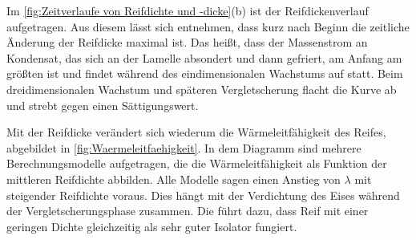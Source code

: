 Im \ref{fig:Zeitverlaufe von Reifdichte und -dicke}(b) ist der Reifdickenverlauf aufgetragen. Aus diesem lässt sich entnehmen, dass kurz nach Beginn die zeitliche Änderung der Reifdicke maximal ist. Das heißt, dass der Massenstrom an Kondensat, das sich an der Lamelle absondert und dann gefriert, am Anfang am größten ist und findet während des eindimensionalen Wachstums auf statt. Beim dreidimensionalen Wachstum und späteren Vergletscherung flacht die Kurve ab und strebt gegen einen Sättigungswert. 


 
Mit der Reifdicke verändert sich wiederum die Wärmeleitfähigkeit des Reifes, abgebildet in \ref{fig:Waermeleitfaehigkeit}. In dem Diagramm sind mehrere Berechnungsmodelle aufgetragen, die die Wärmeleitfähigkeit als Funktion der mittleren Reifdichte abbilden. Alle Modelle sagen einen Anstieg von $\lambda$ mit steigender Reifdichte voraus. Dies hängt mit der Verdichtung des Eises während der Vergletscherungsphase zusammen. Die führt dazu, dass Reif mit einer geringen Dichte gleichzeitig als sehr guter Isolator fungiert. \citep{Baehr2013}  \citep{Kosowski2009}


